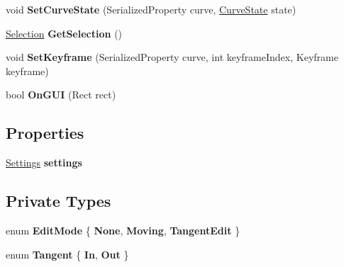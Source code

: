 \begin{DoxyCompactItemize}
\item 
\mbox{\label{class_unity_editor_1_1_post_processing_1_1_curve_editor_adda8f9c24e3ca6427dc4925149eb335f}} 
void {\bfseries Set\+Curve\+State} (Serialized\+Property curve, \hyperlink{struct_unity_editor_1_1_post_processing_1_1_curve_editor_1_1_curve_state}{Curve\+State} state)
\item 
\mbox{\label{class_unity_editor_1_1_post_processing_1_1_curve_editor_aa582a6afdd1d913fcf3f4487aad3aa23}} 
\hyperlink{struct_unity_editor_1_1_post_processing_1_1_curve_editor_1_1_selection}{Selection} {\bfseries Get\+Selection} ()
\item 
\mbox{\label{class_unity_editor_1_1_post_processing_1_1_curve_editor_ab7f943a6c54cfc8ac566368fd75f1ec3}} 
void {\bfseries Set\+Keyframe} (Serialized\+Property curve, int keyframe\+Index, Keyframe keyframe)
\item 
\mbox{\label{class_unity_editor_1_1_post_processing_1_1_curve_editor_acdfe09e9ed98fd21d533de5b7b46f0a2}} 
bool {\bfseries On\+G\+UI} (Rect rect)
\end{DoxyCompactItemize}
\subsection*{Properties}
\begin{DoxyCompactItemize}
\item 
\mbox{\label{class_unity_editor_1_1_post_processing_1_1_curve_editor_abd5edf07120ac0632d77f9b6701311c0}} 
\hyperlink{struct_unity_editor_1_1_post_processing_1_1_curve_editor_1_1_settings}{Settings} {\bfseries settings}
\end{DoxyCompactItemize}
\subsection*{Private Types}
\begin{DoxyCompactItemize}
\item 
\mbox{\label{class_unity_editor_1_1_post_processing_1_1_curve_editor_a6db4c5ebaf5269344e7c4aa1bf3bd9bf}} 
enum {\bfseries Edit\+Mode} \{ {\bfseries None}, 
{\bfseries Moving}, 
{\bfseries Tangent\+Edit}
 \}
\item 
\mbox{\label{class_unity_editor_1_1_post_processing_1_1_curve_editor_af0160a510fe33588a4fb9827dd4beda4}} 
enum {\bfseries Tangent} \{ {\bfseries In}, 
{\bfseries Out}
 \}
\end{DoxyCompactItemize}
